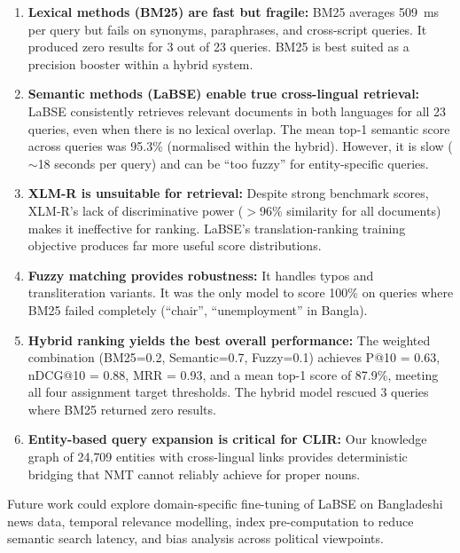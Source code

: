 \documentclass[12pt,a4paper]{article}
\begin{document}
\begin{enumerate}
    \item \textbf{Lexical methods (BM25) are fast but fragile:} BM25 averages 509~ms per query but fails on synonyms, paraphrases, and cross-script queries. It produced zero results for 3 out of 23 queries. BM25 is best suited as a precision booster within a hybrid system.

    \item \textbf{Semantic methods (LaBSE) enable true cross-lingual retrieval:} LaBSE consistently retrieves relevant documents in both languages for all 23 queries, even when there is no lexical overlap. The mean top-1 semantic score across queries was 95.3\% (normalised within the hybrid). However, it is slow ($\sim$18 seconds per query) and can be ``too fuzzy'' for entity-specific queries.

    \item \textbf{XLM-R is unsuitable for retrieval:} Despite strong benchmark scores, XLM-R's lack of discriminative power ($>$96\% similarity for all documents) makes it ineffective for ranking. LaBSE's translation-ranking training objective produces far more useful score distributions.

    \item \textbf{Fuzzy matching provides robustness:} It handles typos and transliteration variants. It was the only model to score 100\% on queries where BM25 failed completely (``chair'', ``unemployment'' in Bangla).

    \item \textbf{Hybrid ranking yields the best overall performance:} The weighted combination (BM25=0.2, Semantic=0.7, Fuzzy=0.1) achieves P@10 = 0.63, nDCG@10 = 0.88, MRR = 0.93, and a mean top-1 score of 87.9\%, meeting all four assignment target thresholds. The hybrid model rescued 3 queries where BM25 returned zero results.

    \item \textbf{Entity-based query expansion is critical for CLIR:} Our knowledge graph of 24{,}709 entities with cross-lingual links provides deterministic bridging that NMT cannot reliably achieve for proper nouns.
\end{enumerate}

Future work could explore domain-specific fine-tuning of LaBSE on Bangladeshi news data, temporal relevance modelling, index pre-computation to reduce semantic search latency, and bias analysis across political viewpoints.

\newpage
\printbibliography[title={References}]
\end{document}
